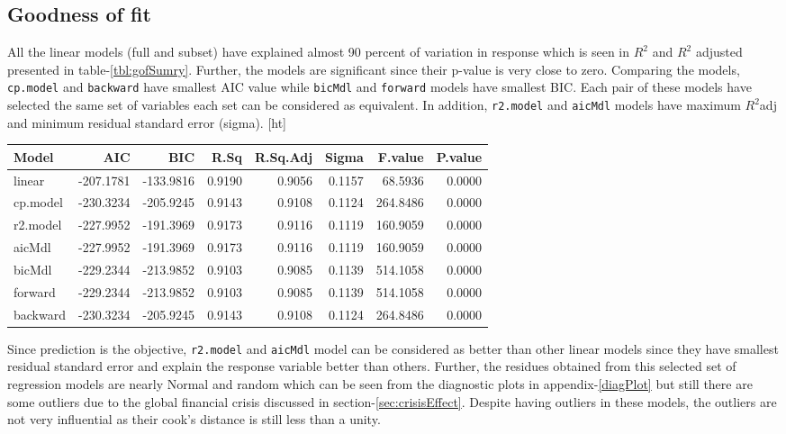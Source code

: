 \documentclass[12pt, lot, lof]{thesis}\usepackage[]{graphicx}\usepackage[]{color}
\makeatletter
\renewenvironment{table}%
  {\renewcommand{\familydefault}{\sfdefault}\selectfont
  \@float{table}}
  {\end@float}
\makeatother
\begin{document}
\subsection{Goodness of fit}
\label{ssec:gof}
All the linear models (full and subset) have explained almost 90 percent of variation in response which is seen in $R^2$ and $R^2$ adjusted presented in table-\ref{tbl:gofSumry}. Further, the models are significant since their p-value is very close to zero. Comparing the models, \texttt{cp.model} and \texttt{backward} have smallest AIC value while \texttt{bicMdl} and \texttt{forward} models have smallest BIC. Each pair of these models have selected the same set of variables each set can be considered as equivalent. In addition, \texttt{r2.model} and \texttt{aicMdl} models have maximum $R^2$adj and minimum residual standard error (sigma).
\begin{table}[ht]
\centering
\caption{Summary statistic and information criteria for model comparison} 
\label{tbl:gofSumry}
\begin{tabularx}{\textwidth}{Xrrrrrrr}
  \hline
Model & AIC & BIC & R.Sq & R.Sq.Adj & Sigma & F.value & P.value \\ 
  \hline
linear & -207.1781 & -133.9816 & 0.9190 & 0.9056 & 0.1157 & 68.5936 & 0.0000 \\ 
  cp.model & -230.3234 & -205.9245 & 0.9143 & 0.9108 & 0.1124 & 264.8486 & 0.0000 \\ 
  r2.model & -227.9952 & -191.3969 & 0.9173 & 0.9116 & 0.1119 & 160.9059 & 0.0000 \\ 
  aicMdl & -227.9952 & -191.3969 & 0.9173 & 0.9116 & 0.1119 & 160.9059 & 0.0000 \\ 
  bicMdl & -229.2344 & -213.9852 & 0.9103 & 0.9085 & 0.1139 & 514.1058 & 0.0000 \\ 
  forward & -229.2344 & -213.9852 & 0.9103 & 0.9085 & 0.1139 & 514.1058 & 0.0000 \\ 
  backward & -230.3234 & -205.9245 & 0.9143 & 0.9108 & 0.1124 & 264.8486 & 0.0000 \\ 
   \hline
\end{tabularx}
\end{table}


Since prediction is the objective, \texttt{r2.model} and \texttt{aicMdl} model can be considered as better than other linear models since they have smallest residual standard error and explain the response variable better than others. Further, the residues obtained from this selected set of regression models are nearly Normal and random which can be seen from the diagnostic plots in appendix-\ref{diagPlot} but still there are some outliers due to the global financial crisis discussed in section-\ref{sec:crisisEffect}. Despite having outliers in these models, the outliers are not very influential as their cook's distance is still less than a unity.
\end{document}
